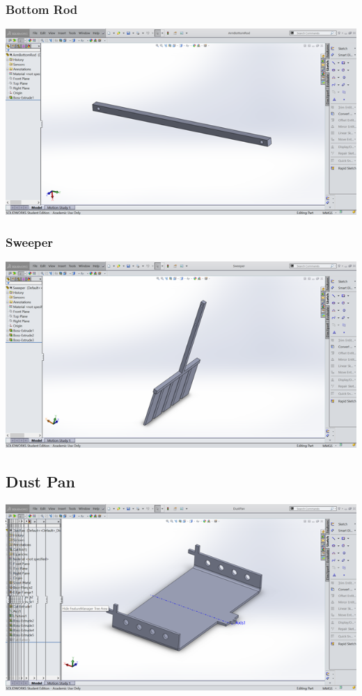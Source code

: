 \documentclass[12pt]{article}
\begin{document}
\subsubsection{Bottom Rod}
\includegraphics{bottom-rod}
\subsubsection{Sweeper}
\includegraphics{sweeper}
\subsection{Dust Pan}
\includegraphics{dust-pan}
\end{document}
